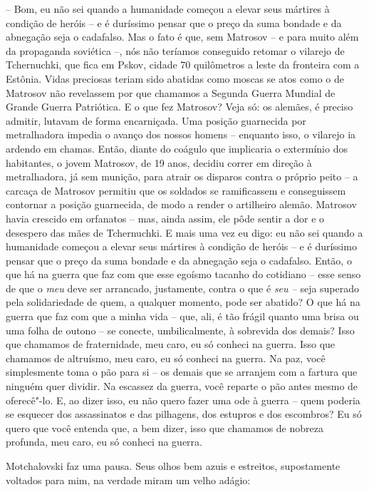 -- Bom, eu não sei quando a humanidade começou a elevar seus mártires à
condição de heróis -- e é duríssimo pensar que o preço da suma bondade e
da abnegação seja o cadafalso. Mas o fato é que, sem Matrosov -- e para
muito além da propaganda soviética --, nós não teríamos conseguido
retomar o vilarejo de Tchernuchki, que fica em Pskov, cidade 70
quilômetros a leste da fronteira com a Estônia. Vidas preciosas teriam
sido abatidas como moscas se atos como o de Matrosov não revelassem por
que chamamos a Segunda Guerra Mundial de Grande Guerra Patriótica. E o
que fez Matrosov? Veja só: os alemães, é preciso admitir, lutavam de
forma encarniçada. Uma posição guarnecida por metralhadora impedia o
avanço dos nossos homens -- enquanto isso, o vilarejo ia ardendo em
chamas. Então, diante do coágulo que implicaria o extermínio dos
habitantes, o jovem Matrosov, de 19 anos, decidiu correr em direção à
metralhadora, já sem munição, para atrair os disparos contra o próprio
peito -- a carcaça de Matrosov permitiu que os soldados se ramificassem
e conseguissem contornar a posição guarnecida, de modo a render o
artilheiro alemão. Matrosov havia crescido em orfanatos -- mas, ainda
assim, ele pôde sentir a dor e o desespero das mães de Tchernuchki. E
mais uma vez eu digo: eu não sei quando a humanidade começou a elevar
seus mártires à condição de heróis -- e é duríssimo pensar que o preço
da suma bondade e da abnegação seja o cadafalso. Então, o que há na
guerra que faz com que esse egoísmo tacanho do cotidiano -- esse senso
de que o \emph{meu} deve ser arrancado, justamente, contra o que é
\emph{seu --} seja superado pela solidariedade de quem, a qualquer
momento, pode ser abatido? O que há na guerra que faz com que a minha
vida -- que, ali, é tão frágil quanto uma brisa ou uma folha de outono
-- se conecte, umbilicalmente, à sobrevida dos demais? Isso que chamamos
de fraternidade, meu caro, eu só conheci na guerra. Isso que chamamos de
altruísmo, meu caro, eu só conheci na guerra. Na paz, você simplesmente
toma o pão para si -- os demais que se arranjem com a fartura que
ninguém quer dividir. Na escassez da guerra, você reparte o pão antes
mesmo de oferecê"-lo. E, ao dizer isso, eu não quero fazer uma ode à
guerra -- quem poderia se esquecer dos assassinatos e das pilhagens, dos
estupros e dos escombros? Eu só quero que você entenda que, a bem dizer,
isso que chamamos de nobreza profunda, meu caro, eu só conheci na
guerra.

Motchalovski faz uma pausa. Seus olhos bem azuis e estreitos,
supostamente voltados para mim, na verdade miram um velho adágio:

